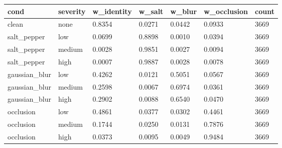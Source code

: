 \begin{tabular}{lllllll}
\hline
cond & severity & w\_identity & w\_salt & w\_blur & w\_occlusion & count \\
\hline
clean & none & 0.8354 & 0.0271 & 0.0442 & 0.0933 & 3669 \\
salt\_pepper & low & 0.0699 & 0.8898 & 0.0010 & 0.0394 & 3669 \\
salt\_pepper & medium & 0.0028 & 0.9851 & 0.0027 & 0.0094 & 3669 \\
salt\_pepper & high & 0.0007 & 0.9887 & 0.0028 & 0.0078 & 3669 \\
gaussian\_blur & low & 0.4262 & 0.0121 & 0.5051 & 0.0567 & 3669 \\
gaussian\_blur & medium & 0.2598 & 0.0067 & 0.6974 & 0.0361 & 3669 \\
gaussian\_blur & high & 0.2902 & 0.0088 & 0.6540 & 0.0470 & 3669 \\
occlusion & low & 0.4861 & 0.0377 & 0.0302 & 0.4461 & 3669 \\
occlusion & medium & 0.1744 & 0.0250 & 0.0131 & 0.7876 & 3669 \\
occlusion & high & 0.0373 & 0.0095 & 0.0049 & 0.9484 & 3669 \\
\hline
\end{tabular}
